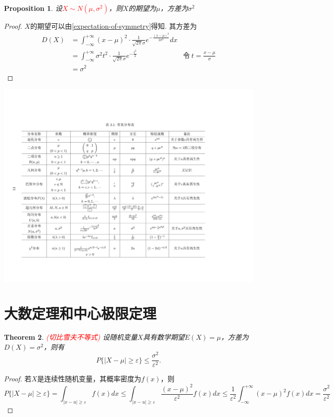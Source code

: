 \documentclass{article}
\newtheorem{theorem}{Theorem}[section]
\newtheorem{proposition}[theorem]{Proposition}
\newcommand{\redt}[1]{\textcolor{red}{#1}}
\begin{document}
\begin{proposition}
\rm 设\redt{$X \sim N(\mu,\sigma^2)$}，则$X$的期望为$\mu$，方差为$\sigma^2$
\end{proposition}

\begin{proof}
$X$的期望可以由\ref{expectation-of-symmetry}得知. 其方差为
$$
\begin{array}{llr}
D(X) &= \int_{-\infty}^{+\infty} (x-\mu)^2 \cdot \frac{1}{\sqrt{2\pi}\sigma} e^{-\frac{(x-\mu)^2}{2\sigma^2}}dx  \\
&= \int_{-\infty}^{+\infty} \sigma^2 t^2 \cdot \frac{1}{\sqrt{2\pi}\sigma} e^{-\frac{t^2}{2}} & \text{令}~t=\frac{x-\mu}{\sigma} \\
&=\sigma^2
\end{array}
$$
\end{proof}

\includegraphics[scale=0.2]{images/regular_distribution_characterize.jpg}


\newpage
\section{大数定理和中心极限定理}

\begin{theorem}
\rm \redt{(切比雪夫不等式)} 设随机变量$X$具有数学期望$E(X)=\mu$，方差为$D(X) = \sigma^2$，则有
$$
P\{|X-\mu| \geq \varepsilon \} \leq \frac{\sigma^2}{\varepsilon^2}. 
$$
\end{theorem}

\begin{proof}
若$X$是连续性随机变量，其概率密度为$f(x)$，则
$$
P\{|X-\mu| \geq \varepsilon \} = \int_{|x-u| \geq \varepsilon} f(x)dx \leq \int_{|x-u| \geq \varepsilon} \frac{(x-\mu)^2}{\varepsilon^2}f(x)dx \leq \frac{1}{\varepsilon^2}\int_{-\infty}^{+\infty}(x-\mu)^2f(x)dx =\frac{\sigma^2}{\varepsilon^2}
$$
\end{proof}
\end{document}
